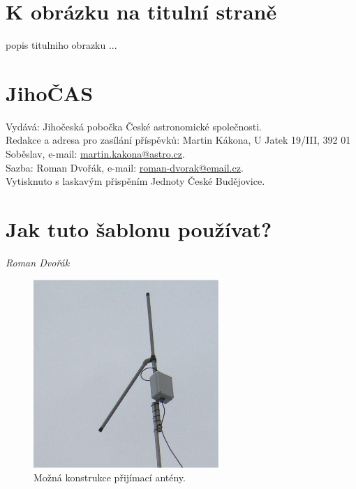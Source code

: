 \documentclass[10pt,a5paper,twoside]{book}
\newcommand{\nadpis}[2]{
\section*{#1}
	\begin{flushright}
	\textit{#2}
	\end{flushright}
}
\begin{document}
 



\section*{K obrázku na titulní straně}
popis titulniho obrazku ...
\vfill
\section*{JihoČAS}
Vydává: Jihočeská pobočka České astronomické společnosti.\\
Redakce a adresa pro zasílání příspěvků: Martin Kákona, U Jatek 19/III, 392 01 Soběslav, e-mail: \href{mailto:martin.kakona@astro.cz}{martin.kakona@astro.cz}.\\
Sazba: Roman Dvořák, e-mail: \href{mailto:roman-dvorak@email.cz}{roman-dvorak@email.cz}.\\
Vytisknuto s laskavým přispěním Jednoty České Budějovice.\newpage

\nadpis{Jak tuto šablonu používat?}{Roman Dvořák}






\begin{figure}[htbp]
	\begin{center}
		\includegraphics[width=7cm]{graves/graves_soubory/image005.eps}
	  	\caption{Možná konstrukce přijímací antény.}
	  	\label{fig:}
	\end{center}
\end{figure}
\end{document}
